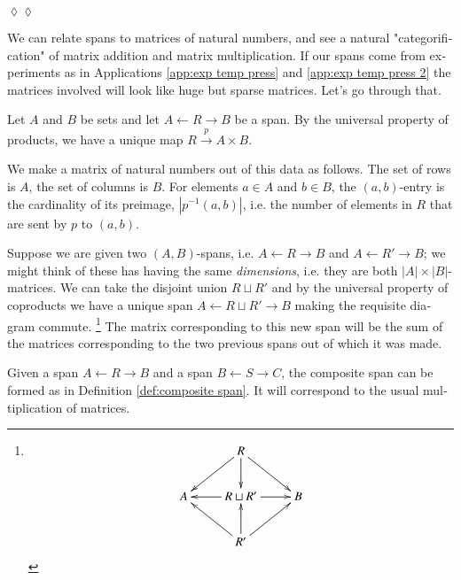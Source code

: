 \documentclass{book}
\def\to{\rightarrow}
\def\from{\leftarrow}
\def\m1{{-1}}
\newcommand{\To}[1]{\xrightarrow{#1}}
\theoremstyle{theoremENG}
\theoremstyle{lemmaENG}
\theoremstyle{propositionENG}
\theoremstyle{corollaryENG}
\theoremstyle{factENG}
\theoremstyle{remarkENG}
\theoremstyle{exampleENG}
\theoremstyle{warningENG}
\theoremstyle{questionENG}
\theoremstyle{guessENG}
\theoremstyle{answerENG}
\theoremstyle{constructionENG}
\theoremstyle{rulesENG}
\theoremstyle{excENG}
\theoremstyle{appENG}
\newtheorem{appENG}[subsubsection]{\begin{english}Application\end{english}}
\theoremstyle{definitionENG}
\theoremstyle{notationENG}
\theoremstyle{conjectureENG}
\theoremstyle{postulateENG}
\newenvironment{applicationENG}{\begin{appENG}}{\hspace*{\fill}$\lozenge\lozenge$\end{appENG}}
\theoremstyle{theoremRUS}
\theoremstyle{lemmaRUS}
\theoremstyle{propositionRUS}
\theoremstyle{corollaryRUS}
\theoremstyle{factRUS}
\theoremstyle{remarkRUS}
\theoremstyle{exampleRUS}
\theoremstyle{warningRUS}
\theoremstyle{questionRUS}
\theoremstyle{guessRUS}
\theoremstyle{answerRUS}
\theoremstyle{constructionRUS}
\theoremstyle{rulesRUS}
\theoremstyle{excRUS}
\theoremstyle{appRUS}
\theoremstyle{definitionRUS}
\theoremstyle{notationRUS}
\theoremstyle{conjectureRUS}
\theoremstyle{postulateRUS}
\begin{document}
\begin{english}
\begin{applicationENG}
\begin{russian} \end{russian}

\end{applicationENG}

We can relate spans to matrices of natural numbers, and see a natural "categorification" of matrix addition and matrix multiplication. If our spans come from experiments as in Applications \ref{app:exp temp press} and \ref{app:exp temp press 2} the matrices involved will look like huge but sparse matrices. Let's go through that.

\begin{russian} \end{russian}

Let $A$ and $B$ be sets and let $A\from R\to B$ be a span. By the universal property of products, we have a unique map $R\To{p}A\times B$. 

\begin{russian} \end{russian}

We make a matrix of natural numbers out of this data as follows. The set of rows is $A$, the set of columns is $B$. For elements $a\in A$ and $b\in B$, the $(a,b)$-entry is the cardinality of its preimage, $|p^\m1(a,b)|$, i.e. the number of elements in $R$ that are sent by $p$ to $(a,b)$. 

\begin{russian} \end{russian}

Suppose we are given two $(A,B)$-spans, i.e. $A\from R\to B$ and $A\from R'\to B$; we might think of these has having the same {\em dimensions}, i.e. they are both $|A|\times|B|$-matrices. We can take the disjoint union $R\sqcup R'$ and by the universal property of coproducts we have a unique span $A\from R\sqcup R'\to B$ making the requisite diagram commute.
\footnote{
$$\xymatrix{
&R\ar[dl]\ar[dr]\ar[d]\\
A&R\sqcup R'\ar[l]\ar[r]&B\\
&R'\ar[ur]\ar[ul]\ar[u]}
$$
}
The matrix corresponding to this new span will be the sum of the matrices corresponding to the two previous spans out of which it was made.

\begin{russian} \end{russian}

Given a span $A\from R\to B$ and a span $B\from S\to C$, the composite span can be formed as in Definition \ref{def:composite span}. It will correspond to the usual multiplication of matrices.


\end{english}
\end{document}
